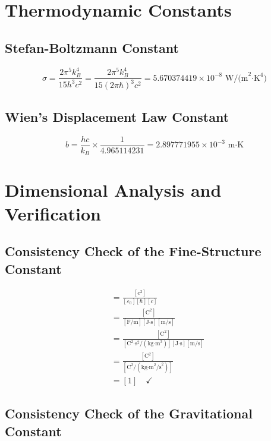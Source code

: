 	\section{Thermodynamic Constants}
	
	\subsection{Stefan-Boltzmann Constant}
	
	\begin{equation}
		\sigma = \frac{2\pi^5 k_B^4}{15 h^3 c^2} = \frac{2\pi^5 k_B^4}{15 (2\pi\hbar)^3 c^2} = 5.670374419 \times 10^{-8} \text{ W/(m}^2\text{·K}^4\text{)}
	\end{equation}
	
	\subsection{Wien's Displacement Law Constant}
	
	\begin{equation}
		b = \frac{hc}{k_B} \times \frac{1}{4.965114231} = 2.897771955 \times 10^{-3} \text{ m·K}
	\end{equation}
	
	\section{Dimensional Analysis and Verification}
	
	\subsection{Consistency Check of the Fine-Structure Constant}
	
	\begin{align}
		[\alpha] &= \frac{[e^2]}{[\varepsilon_0][\hbar][c]}\\
		&= \frac{[\text{C}^2]}{[\text{F/m}][\text{J·s}][\text{m/s}]}\\
		&= \frac{[\text{C}^2]}{[\text{C}^2\text{·s}^2/(\text{kg·m}^3)][\text{J·s}][\text{m/s}]}\\
		&= \frac{[\text{C}^2]}{[\text{C}^2/(\text{kg·m}^2\text{/s}^2)]}\\
		&= [1] \quad \checkmark
	\end{align}
	
	\subsection{Consistency Check of the Gravitational Constant}
	
